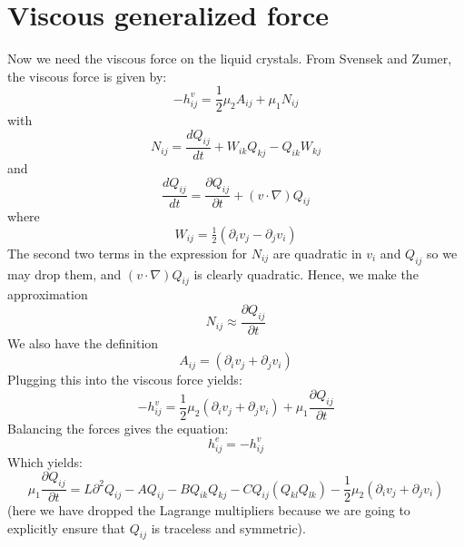 \documentclass[reqno]{article}
\begin{document}
	\section{Viscous generalized force}
	Now we need the viscous force on the liquid crystals. From Svensek and Zumer, the viscous force is given by:
	\begin{equation}
		-h^v_{ij} = \frac{1}{2} \mu_2 A_{ij} + \mu_1 N_{ij}
	\end{equation}
	with 
	\begin{equation}
		N_{ij} = \frac{d Q_{ij}}{dt} + W_{ik} Q_{kj} - Q_{ik} W_{kj}
	\end{equation}
	and
	\begin{equation}
		\frac{d Q_{ij}}{dt} = \frac{\partial Q_{ij}}{\partial t} + (v\cdot \nabla)Q_{ij}
	\end{equation}
	where
	\begin{equation}
		W_{ij} = \tfrac12 \left( \partial_i v_j - \partial_j v_i \right)
	\end{equation}
	The second two terms in the expression for $N_{ij}$ are quadratic in $v_i$ and $Q_{ij}$ so we may drop them, and $(v\cdot \nabla)Q_{ij}$ is clearly quadratic. Hence, we make the approximation
	\begin{equation}
		N_{ij} \approx \frac{\partial Q_{ij}}{\partial t}
	\end{equation}
	We also have the definition
	\begin{equation}
		A_{ij} = (\partial_i v_j + \partial_j v_i)
	\end{equation}
	Plugging this into the viscous force yields:
	\begin{equation}
		-h^v_{ij} = \frac{1}{2}\mu_2 (\partial_i v_j + \partial_j v_i) + \mu_1 \frac{\partial Q_{ij}}{\partial t} 
	\end{equation}
	Balancing the forces gives the equation:
	\begin{equation}
		h^e_{ij} = -h^v_{ij}
	\end{equation}
	Which yields:
	\begin{equation}
		\mu_1 \frac{\partial Q_{ij}}{\partial t}
		= L\partial^2 Q_{ij} 
		- AQ_{ij} - BQ_{ik}Q_{kj} 
		- C Q_{ij} \left( Q_{kl}Q_{lk} \right) 
		- \frac12 \mu_2 \left(\partial_i v_j + \partial_j v_i\right)
	\end{equation}
	(here we have dropped the Lagrange multipliers because we are going to explicitly ensure that $Q_{ij}$ is traceless and symmetric).
	
\end{document}
